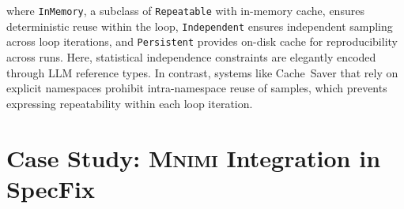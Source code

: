 \documentclass[sigconf]{acmart}
\newcommand{\projName}{\textsc{Mnimi}\xspace}
\begin{document}
\noindent where \texttt{InMemory}, a subclass of \texttt{Repeatable} with in-memory cache, ensures deterministic reuse within the loop, \texttt{Independent} ensures independent sampling across loop iterations, and \texttt{Persistent} provides on-disk cache for reproducibility across runs. Here, statistical independence constraints are elegantly encoded through LLM reference types. In contrast, systems like Cache\ Saver that rely on explicit namespaces prohibit intra-namespace reuse of samples, which prevents expressing repeatability within each loop iteration.

\section{Case Study: \projName Integration in SpecFix}


\begin{table}[ht]
\centering
\caption{
Token usage, runtime, and cost of LLM queries in SpecFix with and without \projName caching (100 HumanEval+ tasks, \texttt{gpt-4.1-mini}, temperature~1.0). C is the number of generated programs, E is the number of generated tests. 
\underline{Baseline} does not read from the cache but records all responses for future reuse, with its results reflecting how Specfix behaved originally.
\underline{No cache} runs ignore caching entirely (no reads or writes).
\underline{First cached} reuses stored results from the baseline, paying only for unseen generations,
and \underline{Cached replay} deterministically replays all queries at zero cost.
}


\end{table}
\end{document}
